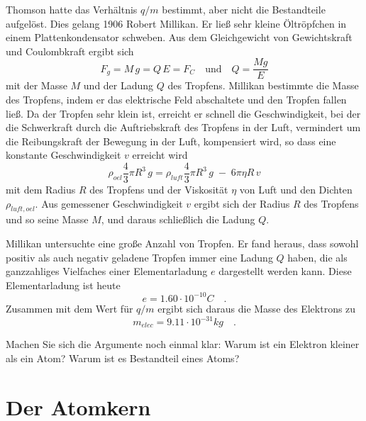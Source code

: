 Thomson hatte das Verhältnis $q/m$ bestimmt, aber nicht die Bestandteile aufgelöst. Dies gelang 1906 Robert Millikan. Er ließ sehr kleine Öltröpfchen in einem Plattenkondensator schweben. Aus dem Gleichgewicht von Gewichtskraft und Coulombkraft ergibt sich 
\begin{equation}
    F_g = M \, g = Q \, E = F_C \quad \text{und} \quad Q = \frac{M g}{E}
\end{equation}
mit der Masse $M$ und der Ladung $Q$ des Tropfens. Millikan bestimmte die Masse des Tropfens, indem er das elektrische Feld abschaltete und den Tropfen fallen ließ. Da der Tropfen sehr klein ist, erreicht er schnell die Geschwindigkeit, bei der die Schwerkraft durch die Auftriebskraft des Tropfens in der Luft, vermindert um die Reibungskraft der Bewegung in der Luft, kompensiert wird, so dass eine konstante Geschwindigkeit $v$ erreicht wird
\begin{equation}
    \rho_{oel} \frac{4}{3} \pi R^3 \, g  =  \rho_{luft} \frac{4}{3} \pi R^3 \, g
     \; - \; 6 
     \pi \eta R \, v 
 \end{equation}
mit dem Radius $R$ des Tropfens und der Viskosität $\eta$ von Luft und den Dichten $\rho_{luft, oel}$. Aus gemessener Geschwindigkeit $v$ ergibt sich  der Radius  $R$ des Tropfens und so seine Masse $M$, und daraus schließlich die Ladung $Q$.

Millikan untersuchte eine große Anzahl von Tropfen. Er fand heraus, dass sowohl positiv als auch negativ geladene Tropfen immer eine Ladung $Q$ haben, die als ganzzahliges Vielfaches einer Elementarladung $e$ dargestellt werden kann. Diese Elementarladung ist heute
\begin{equation}
    e = 1.60 \cdot 10^{-10} C   \quad .
\end{equation}
Zusammen mit dem Wert für $q/m$ ergibt sich daraus die Masse des Elektrons zu
\begin{equation}
    m_{elec} = 9.11 \cdot 10^{-31} kg   \quad .
\end{equation}

\begin{questions}  
    \item Machen Sie sich die Argumente noch einmal klar: Warum ist ein Elektron kleiner als ein Atom? Warum ist es Bestandteil eines Atoms?
\end{questions}

    
\section{Der Atomkern}

